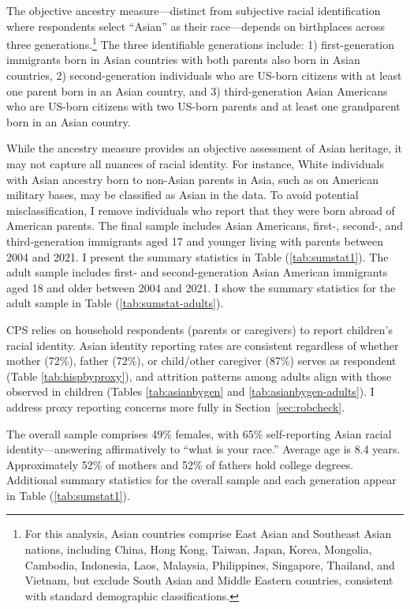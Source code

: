 The objective ancestry measure---distinct from subjective racial identification where respondents select ``Asian'' as their race---depends on birthplaces across three generations.\footnote{For this analysis, Asian countries comprise East Asian and Southeast Asian nations, including China, Hong Kong, Taiwan, Japan, Korea, Mongolia, Cambodia, Indonesia, Laos, Malaysia, Philippines, Singapore, Thailand, and Vietnam, but exclude South Asian and Middle Eastern countries, consistent with standard demographic classifications.} The three identifiable generations include: 1) first-generation immigrants born in Asian countries with both parents also born in Asian countries, 2) second-generation individuals who are US-born citizens with at least one parent born in an Asian country, and 3) third-generation Asian Americans who are US-born citizens with two US-born parents and at least one grandparent born in an Asian country. 

While the ancestry measure provides an objective assessment of Asian heritage, it may not capture all nuances of racial identity. For instance, White individuals with Asian ancestry born to non-Asian parents in Asia, such as on American military bases, may be classified as Asian in the data. To avoid potential misclassification, I remove individuals who report that they were born abroad of American parents. The final sample includes Asian Americans, first-, second-, and third-generation immigrants aged 17 and younger living with parents between 2004 and 2021. I present the summary statistics in Table (\ref{tab:sumstat1}). The adult sample includes first- and second-generation Asian American immigrants aged 18 and older between 2004 and 2021. I show the summary statistics for the adult sample in Table (\ref{tab:sumstat-adults}).

CPS relies on household respondents (parents or caregivers) to report children's racial identity. Asian identity reporting rates are consistent regardless of whether mother (72\%), father (72\%), or child/other caregiver (87\%) serves as respondent (Table \ref{tab:hispbyproxy}), and attrition patterns among adults align with those observed in children (Tables \ref{tab:asianbygen} and \ref{tab:asianbygen-adults}). I address proxy reporting concerns more fully in Section~\ref{sec:robcheck}.

The overall sample comprises 49\% females, with 65\% self-reporting Asian racial identity---answering affirmatively to ``what is your race.'' Average age is 8.4 years. Approximately 52\% of mothers and 52\% of fathers hold college degrees. Additional summary statistics for the overall sample and each generation appear in Table (\ref{tab:sumstat1}).

